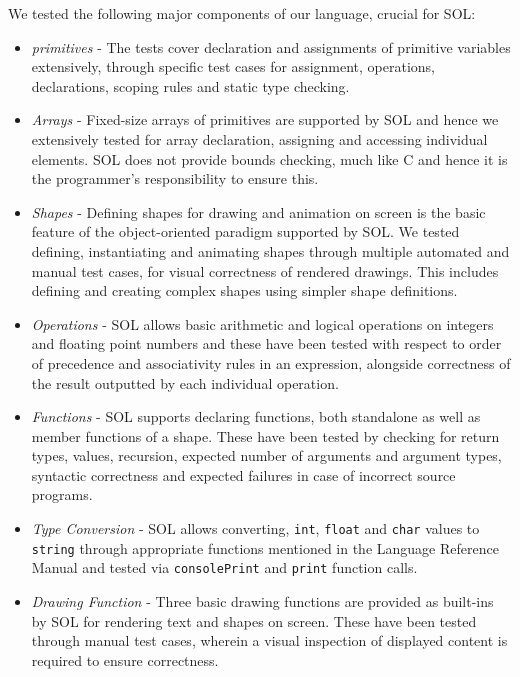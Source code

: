 \documentclass[letterpaper,12pt]{report}
\begin{document}
    We tested the following major components of our language, crucial for SOL:
    \begin{itemize}
      \itemsep 0em
      \item \textit{primitives} - The tests cover declaration and assignments of primitive variables extensively, through specific test cases for assignment, operations, declarations, scoping rules and static type checking.

      \item \textit{Arrays} - Fixed-size arrays of primitives are supported by SOL and hence we extensively tested for array declaration, assigning and accessing individual elements. SOL does not provide bounds checking, much like C and hence it is the programmer's responsibility to ensure this.

      \item \textit{Shapes} - Defining shapes for drawing and animation on screen is the basic feature of the object-oriented paradigm supported by SOL. We tested defining, instantiating and animating shapes through multiple automated and manual test cases, for visual correctness of rendered drawings. This includes defining and creating complex shapes using simpler shape definitions.

      \item \textit{Operations} - SOL allows basic arithmetic and logical operations on integers and floating point numbers and these have been tested with respect to order of precedence and associativity rules in an expression, alongside correctness of the result outputted by each individual operation.

      \item \textit{Functions} - SOL supports declaring functions, both standalone as well as member functions of a shape. These have been tested by checking for return types, values, recursion, expected number of arguments and argument types, syntactic correctness and expected failures in case of incorrect source programs.

      \item \textit{Type Conversion} - SOL allows converting, \texttt{int}, \texttt{float} and \texttt{char} values to \texttt{string} through appropriate functions mentioned in the Language Reference Manual and tested via \texttt{consolePrint} and \texttt{print} function calls.

      \item \textit{Drawing Function} - Three basic drawing functions are provided as built-ins by SOL for rendering text and shapes on screen. These have been tested through manual test cases, wherein a visual inspection of displayed content is required to ensure correctness.


\end{itemize}
\end{document}
